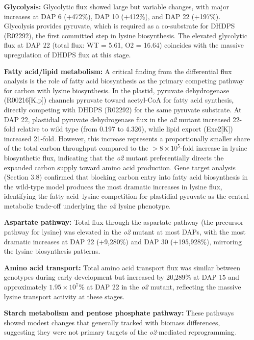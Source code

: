 \documentclass[12pt,a4paper]{article}
\begin{document}
\textbf{Glycolysis:} Glycolytic flux showed large but variable changes, with major increases at DAP 6 (+472\%), DAP 10 (+412\%), and DAP 22 (+197\%). Glycolysis provides pyruvate, which is required as a co-substrate for DHDPS (R02292), the first committed step in lysine biosynthesis. The elevated glycolytic flux at DAP 22 (total flux: WT = 5.61, O2 = 16.64) coincides with the massive upregulation of DHDPS flux at this stage.

\textbf{Fatty acid/lipid metabolism:} A critical finding from the differential flux analysis is the role of fatty acid biosynthesis as the primary competing pathway for carbon with lysine biosynthesis. In the plastid, pyruvate dehydrogenase (R00216[K,p]) channels pyruvate toward acetyl-CoA for fatty acid synthesis, directly competing with DHDPS (R02292) for the same pyruvate substrate. At DAP 22, plastidial pyruvate dehydrogenase flux in the \textit{o2} mutant increased 22-fold relative to wild type (from 0.197 to 4.326), while lipid export (Exe2[K]) increased 21-fold. However, this increase represents a proportionally smaller share of the total carbon throughput compared to the $>8 \times 10^{5}$-fold increase in lysine biosynthetic flux, indicating that the \textit{o2} mutant preferentially directs the expanded carbon supply toward amino acid production. Gene target analysis (Section 3.8) confirmed that blocking carbon entry into fatty acid biosynthesis in the wild-type model produces the most dramatic increases in lysine flux, identifying the fatty acid--lysine competition for plastidial pyruvate as the central metabolic trade-off underlying the \textit{o2} lysine phenotype.

\textbf{Aspartate pathway:} Total flux through the aspartate pathway (the precursor pathway for lysine) was elevated in the \textit{o2} mutant at most DAPs, with the most dramatic increases at DAP 22 (+9,280\%) and DAP 30 (+195,928\%), mirroring the lysine biosynthesis patterns.

\textbf{Amino acid transport:} Total amino acid transport flux was similar between genotypes during early development but increased by 20,289\% at DAP 15 and approximately $1.95 \times 10^{7}$\% at DAP 22 in the \textit{o2} mutant, reflecting the massive lysine transport activity at these stages.

\textbf{Starch metabolism and pentose phosphate pathway:} These pathways showed modest changes that generally tracked with biomass differences, suggesting they were not primary targets of the \textit{o2}-mediated reprogramming.
\end{document}

